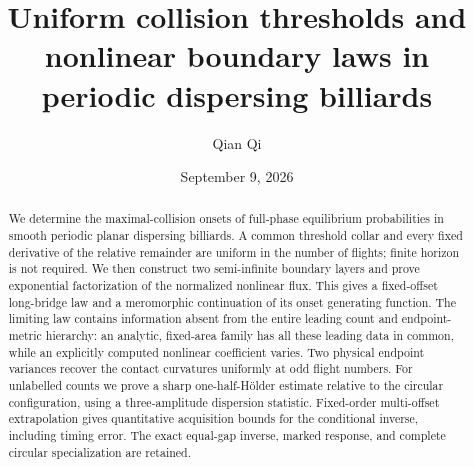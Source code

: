 
\title[Collision thresholds and nonlinear boundary laws]{Uniform collision thresholds and nonlinear boundary laws
in periodic dispersing billiards}
\author{Qian Qi}
\date{September 9, 2026}

\begin{abstract}
We determine the maximal-collision onsets of full-phase equilibrium
probabilities in smooth periodic planar dispersing billiards. A common
threshold collar and every fixed derivative of the relative remainder
are uniform in the number of flights; finite horizon is not required.
We then construct two semi-infinite boundary layers and prove exponential
factorization of the normalized nonlinear flux. This gives a fixed-offset
long-bridge law and a meromorphic continuation of its onset generating
function. The limiting law contains information absent from the entire
leading count and endpoint-metric hierarchy: an analytic, fixed-area
family has all these leading data in common, while an explicitly computed
nonlinear coefficient varies. Two physical endpoint variances recover the
contact curvatures uniformly at odd flight numbers. For unlabelled counts
we prove a sharp one-half-H\"older estimate relative to the circular
configuration, using a three-amplitude dispersion statistic. Fixed-order
multi-offset extrapolation gives quantitative acquisition bounds for the
conditional inverse, including timing error. The exact equal-gap inverse,
marked response, and complete circular specialization are retained.
\end{abstract}
\maketitle











\appendix









